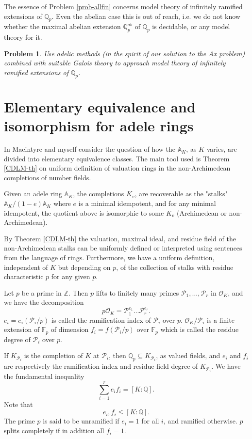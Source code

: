 \documentclass[12pt]{amsart}
\def\A{\mathbb{A}}
\def\F{\mathbb{F}}
\def\Z{\mathbb{Z}}
\def\Q{\mathbb{Q}}
\def\F{\mathbb{F}}
\def\cP{\mathcal{P}}
\def\cO{\mathcal{O}}
\numberwithin{equation}{section}
\newtheorem{prob}{Problem}[section]
\begin{document}
The essence of Problem \ref{prob-allfin} concerns model theory of infinitely ramified extensions of $\Q_p$. Even the abelian case this is out of reach, i.e. 
we do not know whether the maximal abelian extension $\Q_p^{ab}$ of $\Q_p$ is decidable, or any model theory for it.

\begin{prob} Use adelic methods (in the spirit of our solution to the Ax problem) combined with suitable Galois theory to approach model theory of infinitely ramified extensions of $\Q_p$.\end{prob}


\section{\bf Elementary equivalence and isomorphism for adele rings}\label{sec-elem}

In \cite{DM-ad2} Macintyre and myself consider the question of how the $\A_K$, as $K$ varies, are divided into elementary equivalence classes. 
The main tool used is Theorem \ref{CDLM-th} on uniform definition of valuation rings in the non-Archimedean completions of number fields. 

Given an adele ring $\A_K$, the completions $K_v$, are recoverable as the "stalks" $\A_K/(1-e)\A_K$ where $e$ is a minimal idempotent, and for any minimal idempotent, the quotient above is isomorphic to some $K_v$ (Archimedean or non-Archimedean). 

By Theorem \ref{CDLM-th} the valuation, maximal ideal, and residue field of the non-Archimedean stalks can be uniformly defined or interpreted using sentences from the language of rings. 
Furthermore, we have a uniform definition, independent of $K$ but depending on $p$, of the collection of stalks with residue characteristic $p$ for any given $p$. 

Let $p$ be a prime in $\Z$. Then $p$ lifts to finitely many primes $\cP_1,\dots,\cP_r$ in $\cO_K$, and we have the decomposition
$$p\cO_K=\cP_1^{e_1}\dots \cP_r^{e_r}.$$
$e_i=e_i(\cP_i/p)$ is called the ramification index of $\cP_i$ over $p$. 
$\cO_K/\cP_i$ is a finite extension of $\F_p$ of dimension $f_i=f(\cP_i/p)$ over $\F_p$ which is called the residue degree of $\cP_i$ over $p$. 

If $K_{\cP_i}$ is the completion of $K$ at $\cP_i$, 
then $\Q_p\subseteq K_{\cP_i}$, as valued fields, and $e_i$ and $f_i$ are respectively the ramification index and residue field degree of $K_{\cP_i}$. We have the fundamental 
inequality 
$$\sum_{i=1}^{r} e_if_i=[K:\Q].$$ 
Note that 
$$e_i,f_i\leq [K:\Q].$$
The prime $p$ is said to be unramified if $e_i=1$ for all $i$, and ramified otherwise. $p$ splits completely if in addition all $f_i=1$.
\end{document}
